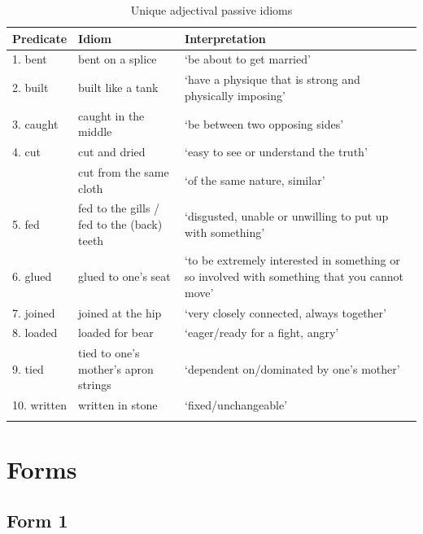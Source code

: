 \documentclass[output=paper]{langsci/langscibook}
\begin{document}
\begin{paperappendix}
\begin{table}[H]
{\smaller
\caption{Unique adjectival passive idioms}
\begin{tabularx}{\textwidth}{llQ}
\lsptoprule
{Predicate} & {Idiom} & {Interpretation}\\
\midrule
{1. bent}     & {bent on a splice}                             & ‘be about to get married’\\
{2. built}    & {built like a tank}                            & ‘have a physique that is strong and physically imposing’\\
{3. caught}   & {caught in the middle}                         & ‘be between two opposing sides’ \\
{4. cut}      & {cut and dried}                                & ‘easy to see or understand the truth’ \\
              & {cut from the same cloth}                      & ‘of the same nature, similar’ \\
{5. fed}      & {fed to the gills  / fed to the (back) teeth } & ‘disgusted, unable or unwilling to put up with something’ \\
{6. glued}    & {glued to one’s seat}                          & ‘to be extremely interested in something or so involved with something that you cannot move’\\
{7. joined}   & {joined at the hip}                            & ‘very closely connected, always together’\\
{8. loaded}   & { loaded for bear}                             & ‘eager/ready for a fight, angry’\\
{9. tied}     & { tied to one’s mother’s apron strings}        & ‘dependent on/dominated by one’s mother’ \\
{10. written} & { written in stone}                            & ‘fixed/unchangeable’ \\
\lspbottomrule
\end{tabularx}
}
\end{table}

\clearpage
\section{Forms}\label{app-14:b}

\subsection{Form 1}


\end{paperappendix}
\end{document}
